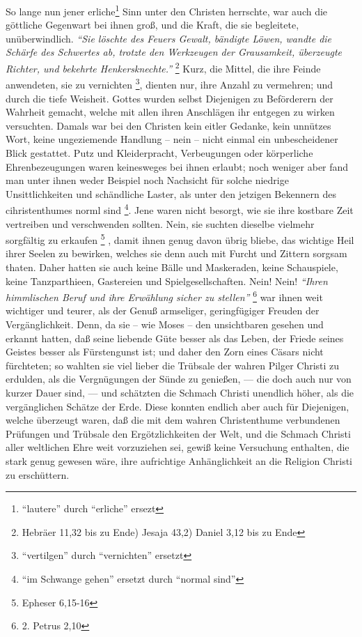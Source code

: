 \medskip

So lange nun jener erliche\footnote{"`lautere"' durch "`erliche"' ersezt}
Sinn unter den Christen herrschte, war auch die
göttliche Gegenwart bei ihnen groß, und die Kraft, die sie begleitete,
unüberwindlich.
\textit{"`Sie löschte des Feuers Gewalt, bändigte Löwen,
wandte die Schärfe des Schwertes ab, trotzte den Werkzeugen der Grausamkeit,
überzeugte Richter, und bekehrte Henkersknechte."'}
\footnote{Hebräer 11,32 bis zu Ende) Jesaja 43,2) Daniel 3,12 bis zu Ende}
 
Kurz, die Mittel, die ihre Feinde anwendeten, sie
zu vernichten \footnote{"`vertilgen"' durch "`vernichten"' ersetzt}, dienten
nur, ihre Anzahl zu vermehren; und durch die tiefe
Weisheit. Gottes wurden selbst Diejenigen zu Beförderern der Wahrheit gemacht,
welche mit allen ihren Anschlägen ihr entgegen zu wirken versuchten. Damals war
bei den Christen kein eitler Gedanke, kein unnützes Wort, keine ungeziemende
Handlung -- nein -- nicht einmal ein unbescheidener Blick gestattet. Putz und
Kleiderpracht, Verbeugungen oder körperliche Ehrenbezeugungen waren keinesweges
bei ihnen erlaubt; noch weniger aber fand man unter ihnen weder Beispiel noch
Nachsicht für solche niedrige Unsittlichkeiten und schändliche Laster, als unter
den jetzigen Bekennern des cihristenthumes norml sind
\footnote{"`im Schwange gehen"' ersetzt durch "`normal sind"'}. Jene waren nicht
besorgt, wie sie ihre kostbare Zeit vertreiben und verschwenden sollten. Nein,
sie suchten dieselbe vielmehr sorgfältig zu erkaufen
\footnote{Epheser 6,15-16}
,
damit ihnen genug davon übrig bliebe, das wichtige Heil ihrer Seelen zu
bewirken, welches sie denn auch mit Furcht und Zittern sorgsam thaten. Daher
hatten sie auch keine Bälle und Maskeraden, keine Schauspiele, keine
Tanzparthieen, Gastereien und Spielgesellschaften. Nein! Nein!
\textit{"`Ihren himmlischen Beruf und ihre Erwählung sicher zu stellen"'}
\footnote{2. Petrus 2,10}
war ihnen weit wichtiger und teurer, als der Genuß armseliger, geringfügiger
Freuden der Vergänglichkeit. Denn, da sie -- wie Moses -- den unsichtbaren
gesehen und erkannt hatten, daß seine liebende Güte besser als das Leben,
der Friede seines Geistes besser als Fürstengunst ist; und daher den Zorn eines
Cäsars  nicht fürchteten; so wahlten sie viel lieber die Trübsale
der wahren Pilger  Christi zu erdulden, als die Vergnügungen der
Sünde zu genießen, — die doch auch nur von kurzer Dauer sind, — und schätzten
die Schmach Christi unendlich höher, als die vergänglichen Schätze der Erde.
Diese konnten endlich aber auch für Diejenigen, welche überzeugt waren, daß
die mit dem wahren Christenthume verbundenen Prüfungen und Trübsale den
Ergötzlichkeiten der Welt, und die Schmach Christi aller weltlichen Ehre weit
vorzuziehen sei, gewiß keine Versuchung enthalten, die stark genug gewesen wäre,
ihre aufrichtige Anhänglichkeit an die Religion Christi zu erschüttern.

